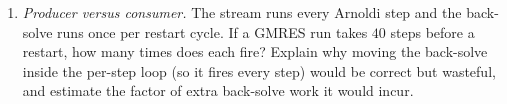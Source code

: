 \begin{enumerate}[nosep]
  (b) the per-element input $\vh$, and (c) the part of the carry that \emph{grows} with
  each step. Why does the presence of the replay sub-step force this to be a
   (a chain) rather than a  (an independent fan-out)? Refer to the
  map/fold split of \cref{ch:combinators}.
  \item \emph{Producer versus consumer.} The stream runs every Arnoldi step and the
  back-solve runs once per restart cycle. If a GMRES run takes $40$ steps before a
  restart, how many times does each fire? Explain why moving the back-solve inside the
  per-step loop (so it fires every step) would be correct but wasteful, and estimate the
  factor of extra back-solve work it would incur.
\end{enumerate}
